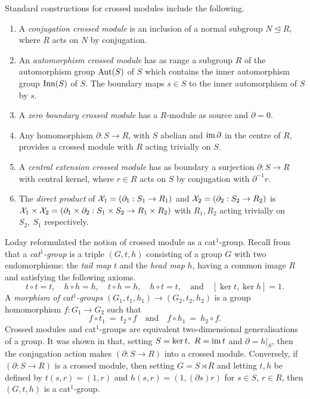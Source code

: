 \documentclass[a4paper,11pt]{article}
\theoremstyle{plain}
\theoremstyle{definition}
\begin{document}
Standard constructions for crossed modules include the following. 
\begin{enumerate}
\item 
A \emph{conjugation crossed module}  
is an inclusion of a normal subgroup $N \unlhd R$, 
where $R$ acts on $N$ by conjugation.
\item 
An \emph{automorphism crossed module}  
has as range a subgroup $R$ of the automorphism group $\mathrm{Aut}(S)$ of $S$ 
which contains the inner automorphism group $\mathrm{Inn}(S)$ of $S$. 
The boundary maps $s \in S$ to the inner automorphism of $S$ by $s$.
\item 
A \emph{zero boundary crossed module}  
has a $R$-module as source and $\partial = 0$.
\item 
Any homomorphism $\partial : S \to R$, with $S$ abelian 
and $\mathrm{im}\,\partial$ in the centre of $R$, 
provides a crossed module with $R$ acting trivially on $S$.
\item 
A \emph{central extension crossed module} 
has as boundary a surjection $\partial : S \to R$ with central kernel, 
where $r \in R$ acts on $S$ by conjugation with $\partial^{-1}r$.
\item 
The \emph{direct product} of  
$\mathcal{X}_1 = (\partial_1 : S_1 \to R_1)$ and $\mathcal{X}_2 = (\partial_2 : S_2 \to R_2)$ 
is $\mathcal{X}_1 \times \mathcal{X}_2 
= (\partial_1 \times \partial_2 : S_1 \times S_2 \to R_1 \times R_2)$ 
with $R_1, R_2$ acting trivially on $S_2,\ S_1$ respectively.
\end{enumerate}

Loday reformulated the notion of crossed module as a cat$^{1}$-group. 
Recall from \cite{Loday} that a \emph{cat$^{1}$-group} is a triple $(G,t,h)$ consisting of a group $G$ with two endomorphisms: 
the \emph{tail map} $t$ and the \emph{head map} $h$, 
having a common image $R$ and satisfying the following axioms. 
\begin{equation} \label{cat1-axioms} 
t \circ t = t, \quad  
h \circ h = h, \quad  
t \circ h = h, \quad  
h \circ t = t, 
\quad \mbox{and}\quad  [\ker t,\ker h] = 1. 
\end{equation} 
A \emph{morphism of cat}$^{1}$\emph{-groups} 
$(G_{1},t_1,h_1) \rightarrow (G_{2},t_2,h_2)$ 
is a group homomorphism $f : G_{1} \rightarrow G_{2}$ such that 
\[ 
f \circ t_1 ~=~ t_2 \circ f  
\quad\mbox{and}\quad 
f \circ h_1 ~=~ h_2 \circ f.
\] 
Crossed modules and cat$^{1}$-groups are equivalent two-dimensional 
generalisations of a group. 
It was shown in \cite[Lemma 2.2]{Loday} that, 
setting $S = \ker t,~ R = \mathrm{im}\, t$ and $\partial = h|_{S}$, 
then the conjugation action makes $(\partial : S \rightarrow R)$ 
into a crossed module. 
Conversely, if $(\partial : S \rightarrow R)$ is a crossed module, 
then setting $G = S \rtimes R$ and letting $t,h$ be defined by 
$t(s,r) = (1,r)$ and $h(s,r) = (1,(\partial s)r)$ for $s \in S$, $r \in R$, 
then $(G,t,h)$ is a cat$^{1}$-group.
\end{document}
